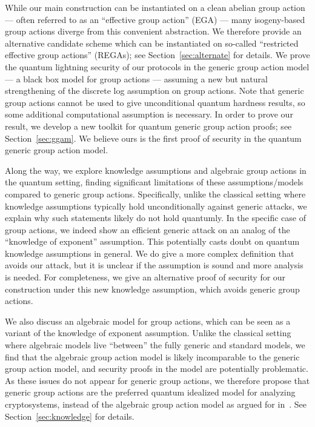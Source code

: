 \documentclass{article}\usepackage[a4paper,margin=20mm]{geometry}
\numberwithin{theorem}{section}
\numberwithin{equation}{section}
\begin{document}
While our main construction can be instantiated on a clean abelian group action --- often referred to as an ``effective group action'' (EGA) --- many isogeny-based group actions diverge from this convenient abstraction. We therefore provide an alternative candidate scheme which can be instantiated on so-called ``restricted effective group actions'' (REGAs); see Section~\ref{sec:alternate} for details. We prove the quantum lightning security of our protocols in the generic group action model --- a black box model for group actions --- assuming a new but natural strengthening of the discrete log assumption on group actions. Note that generic group actions cannot be used to give unconditional quantum hardness results, so some additional computational assumption is necessary. In order to prove our result, we develop a new toolkit for quantum generic group action proofs; see Section~\ref{sec:ggam}. We believe ours is the first proof of security in the quantum generic group action model. 

Along the way, we explore knowledge assumptions and algebraic group actions in the quantum setting, finding significant limitations of these assumptions/models compared to generic group actions. Specifically, unlike the classical setting where knowledge assumptions typically hold unconditionally against generic attacks, we explain why such statements likely do not hold quantumly. In the specific case of group actions, we indeed show an efficient generic attack on an analog of the ``knowledge of exponent'' assumption. This potentially casts doubt on quantum knowledge assumptions in general. We do give a more complex definition that avoids our attack, but it is unclear if the assumption is sound and more analysis is needed. For completeness, we give an alternative proof of security for our construction under this new knowledge assumption, which avoids generic group actions. 

We also discuss an algebraic model for group actions, which can be seen as a variant of the knowledge of exponent assumption. Unlike the classical setting where algebraic models live ``between'' the fully generic and standard models, we find that the algebraic group action model is likely incomparable to the generic group action model, and security proofs in the model are potentially problematic. As these issues do not appear for generic group actions, we therefore propose that generic group actions are the preferred quantum idealized model for analyzing cryptosystems, instead of the algebraic group action model as argued for in~\cite{PKC:DHKKLR23}. See Section~\ref{sec:knowledge} for details.
\end{document}
